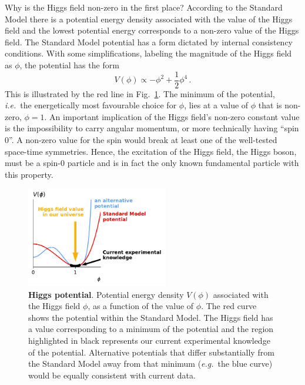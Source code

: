 \documentclass[12pt]{article}
\begin{document}
Why is the Higgs field non-zero in the first place?
%
According to the Standard Model there is a
potential energy density associated with the value of the Higgs field
and the lowest potential energy corresponds to a non-zero value
of the Higgs field.
%
%
The Standard Model potential has a form dictated by 
internal consistency conditions.
%
With some simplifications, labeling the magnitude of the Higgs field
as $\phi$, the potential has the form
\begin{equation}
  \label{eq:Vphi}
  V(\phi) \propto -\phi^2 + \frac12 \phi^4\,.
\end{equation}
%
This is illustrated by the red line in
Fig.~\ref{fig:higgs-potential}.
%
The minimum of the potential, {\it i.e.}\ the energetically most favourable
choice for $\phi$, lies at a value of $\phi$ that is non-zero,
$\phi = 1$.
%
An important implication of the Higgs field's non-zero
constant value is the impossibility to carry angular momentum,
or more technically having ``spin 0''.
%
A non-zero value for the spin would break at least one of the well-tested
space-time symmetries.
%
Hence, the excitation of the Higgs field, the Higgs boson, must be a
spin-0 particle and is in fact the only known fundamental particle with this property.

\begin{figure}[t]
  \centering
  \includegraphics[width=0.55\textwidth]{figs/potential-half-v2.pdf}
  \caption{{\bf Higgs potential}.
    Potential energy density $V(\phi)$ associated with the
    Higgs field $\phi$, as a function of the value of $\phi$.
    The red curve shows the potential within the Standard Model.
    The Higgs field has a value corresponding to a minimum of the
    potential and the region highlighted in black represents our current
    experimental knowledge of the potential.
    Alternative potentials that differ substantially from the Standard
    Model away from that
    minimum ({\it e.g.}\ the blue curve) would be equally consistent with
    current data.  
}
  \label{fig:higgs-potential}
\end{figure}
\end{document}

